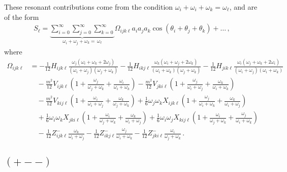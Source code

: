 \documentclass[letterpaper,11pt]{article}
\newcommand{\oi}{\omega_i}
\newcommand{\oj}{\omega_j}
\newcommand{\ok}{\omega_k}
\newcommand{\ol}{\omega_\ell}
\newcommand{\thi}{\theta_i}
\newcommand{\thj}{\theta_j}
\newcommand{\thk}{\theta_k}
\begin{document}
These resonant contributions come from the condition $\oi + \oi + \ok = \ol$, and are of the form
\begin{align}
S_\ell = \underbrace{\sum_{i=0}^\infty \sum_{j=0}^\infty \sum_{k=0}^\infty}_{\oi + \oj + \ok = \, \ol} \Omega_{ijk\ell} a_i a_j a_k \cos \left( \thi + \thj + \thk \right) + \ldots \, ,
\end{align}
where
\begin{align}
\Omega_{ijk\ell} &= -\frac{1}{12}H_{ijk\ell} \frac{\oj (\oi + \ok +2\oj)}{(\oi + \oj)(\oj + \ok)} - \frac{1}{12} H_{ikj\ell} \frac{\ok (\oi + \oj + 2\ok)}{(\oi + \ok)(\oj + \ok)}- \frac{1}{12} H_{jik\ell} \frac{\oi (\oj + \ok +2\oi)}{(\oi + \oj)(\oi + \ok)} \nonumber \\
%
& \quad - \frac{m^2}{12} V_{ijk\ell} \left( 1 + \frac{\oj}{\oj + \ok} + \frac{\oi}{\oi + \ok} \right) - \frac{m^2}{12} V_{jki\ell} \left( 1 + \frac{\oj}{\oi + \oj} + \frac{\ok}{\oi + \ok} \right) \nonumber \\
%
& \quad - \frac{m^2}{12} V_{kij\ell} \left( 1 + \frac{\oi}{\oi + \oj} + \frac{\ok}{\oj + \ok} \right)  + \frac{1}{6} \oj \ok X_{ijk\ell} \left( 1 + \frac{\oj}{\oi + \ok} + \frac{\ok}{\oi + \oj} \right) \nonumber \\
%
& \quad + \frac{1}{6} \oi \ok X_{jki\ell} \left( 1 + \frac{\oi}{\oj + \ok} + \frac{\ok}{\oi + \oj} \right) + \frac{1}{6} \oi \oj X_{kij\ell} \left( 1 + \frac{\oi}{\oj + \ok} + \frac{\oj}{\oi + \ok} \right) \nonumber \\
%
& \quad - \frac{1}{12} Z^-_{ijk\ell} \frac{\ok}{\oi + \oj} - \frac{1}{12} Z^-_{ikj\ell} \frac{\oj}{\oi + \ok} - \frac{1}{12} Z^-_{jki\ell} \frac{\oi}{\oj + \ok} \, .
\end{align}


\subsection{$(+--)$}
\end{document}
